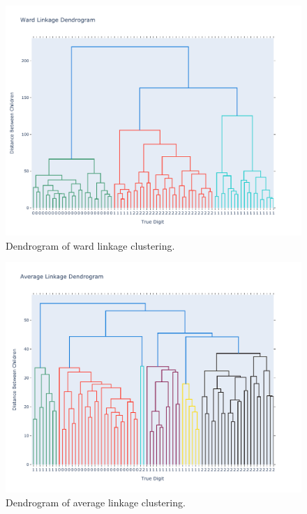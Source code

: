 \documentclass[12pt]{article}
\begin{document}
  \begin{figure}[!ht]
    \centering
    \includegraphics[width=\textwidth]{figures/hclust1}
    \caption{Dendrogram of ward linkage clustering.}%
    \label{fig:hclust1}
  \end{figure} 

  \begin{figure}[!ht]
    \centering
    \includegraphics[width=\textwidth]{figures/hclust2}
    \caption{Dendrogram of average linkage clustering.}%
    \label{fig:hclust2}
  \end{figure} 
\end{document}
